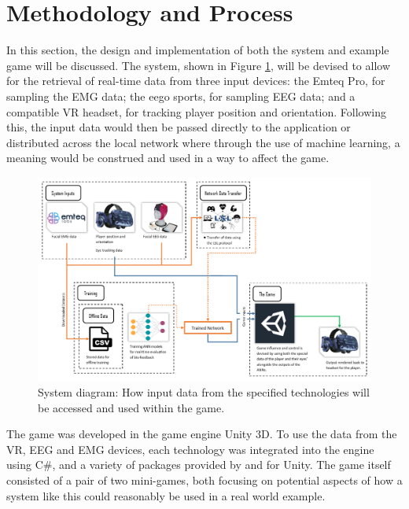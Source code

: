 \documentclass[11pt, a4paper]{article}
\newcommand{\reffigure}[1]{Figure \ref{#1}}
\begin{document}
\pagebreak
\section{Methodology and Process}			%

In this section, the design and implementation of both the system and example game will be discussed. The system, shown in \reffigure{fig:system_diagram_:_generic}, will be devised to allow for the retrieval of real-time data from three input devices: the Emteq Pro, for sampling the EMG data; the eego sports, for sampling EEG data; and a compatible VR headset, for tracking player position and orientation. Following this, the input data would then be passed directly to the application or distributed across the local network where through the use of machine learning, a meaning would be construed and used in a way to affect the game.



\begin{figure}[H]
	\centering
	\includegraphics[width = 0.9 \linewidth] {[ Figures ]/System Diagram.png}
	\captionsetup{font = small, labelfont = small, width=.8\linewidth}
	\caption{System diagram: How input data from the specified technologies will be accessed and used within the game.}
	\label{fig:system_diagram_:_generic}
\end{figure}



The game was developed in the game engine Unity 3D. To use the data from the VR, EEG and EMG devices, each technology was integrated into the engine using C\#, and a variety of packages provided by and for Unity. The game itself consisted of a pair of two mini-games, both focusing on potential aspects of how a system like this could reasonably be used in a real world example. 
\end{document}

